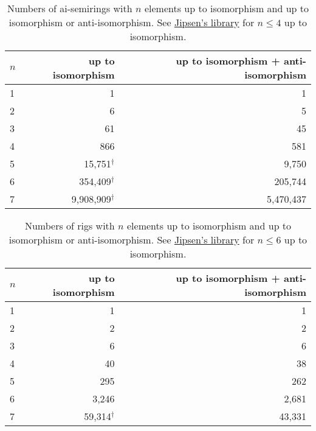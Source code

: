 \documentclass{article}
\theoremstyle{definition}
\begin{document}
\begin{table}[ht]
  \centering
  \begin{tabular}{l|r|r}
    \toprule
    $n$ & up to isomorphism & up to isomorphism + anti-isomorphism \\
    \midrule
    1 & 1         & 1       \\
    2 & 6         & 5       \\
    3 & 61        & 45      \\
    4 & 866       & 581     \\
    5 & 15,751$^\dagger$    & 9,750   \\
    6 & 354,409$^\dagger$   & 205,744 \\
    7 & 9,908,909$^\dagger$ & 5,470,437       \\
  \end{tabular}
  \caption{Numbers of ai-semirings with $n$ elements up to isomorphism and up
  to isomorphism or anti-isomorphism. See \href{https://math.chapman.edu/~jipsen/structures/doku.php?id=idempotent_semirings\#finite_members}{Jipsen's library} for \(n\leq4\) up to isomorphism.}
  \label{tab:ai-semirings}
\end{table}

\begin{table}[ht]
    \centering
    \begin{tabular}{l|r|r}
      \toprule
      $n$ & up to isomorphism & up to isomorphism + anti-isomorphism \\
      \midrule
      1 & 1         & 1      \\
      2 & 2         & 2      \\
      3 & 6         & 6      \\
      4 & 40        & 38     \\
      5 & 295       & 262    \\
      6 & 3,246     & 2,681  \\
      7 & 59,314$^\dagger$    & 43,331 \\
    \end{tabular}
    \caption{Numbers of rigs with $n$ elements up to isomorphism and up
    to isomorphism or anti-isomorphism. See \href{https://math.chapman.edu/~jipsen/structures/doku.php?id=semirings_with_identity_and_zero\#finite_members}{Jipsen's library} for \(n\leq6\) up to isomorphism.}
    \label{tab:rigs}
\end{table}
\end{document}

